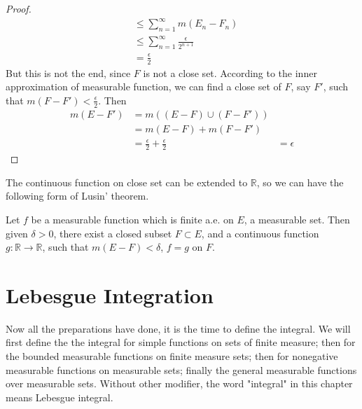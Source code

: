 \documentclass[lang=en, 12pt]{elegantbook}
\newcommand{\RR}{\mathbb{R}}
\begin{document}
\begin{proof}
\begin{equation*}
\begin{aligned}
                    &\leq \sum_{n=1}^{\infty}m(E_n - F_n)\\
                    &\leq \sum_{n=1}^{\infty} \frac{\epsilon}{2^{n+1}}\\
                    &= \frac{\epsilon}{2} 
                \end{aligned}
            \end{equation*}
                But this is not the end, since $F$ is not a close set. According to the inner approximation of measurable function, we can
            find a close set of $F$, say $F'$, such that $m(F-F')< \frac{\epsilon}{2}$. Then 
            \begin{equation*}
                \begin{aligned}
                    m(E-F') &= m ((E-F) \cup (F-F'))\\
                    &= m(E-F) + m(F-F')\\
                    &=\frac{\epsilon}{2} +\frac{\epsilon}{2}
                    &=\epsilon 
                \end{aligned}
            \end{equation*}
            \end{proof}
            The continuous function on close set can be extended to $\RR$, so we can have the following form of Lusin' theorem.
            \begin{theorem}
                Let $f$ be a measurable function which is finite a.e. on $E$, a measurable set. Then given $\delta > 0$, 
            there exist a closed subset $F \subset E$, and a continuous function $g: \RR \to \RR$, such that $m(E-F)< \delta$, 
            $f = g$ on $F$.
            \end{theorem}   
    
    \chapter{Lebesgue Integration}
        Now all the preparations have done, it is the time to define the integral. We will first define the the integral for simple functions
    on sets of finite measure; then for the bounded measurable functions on finite measure sets; then for nonegative measurable functions on measurable sets;
    finally the general measurable functions over measurable sets. Without other modifier, the word "integral" in this chapter means Lebesgue
    integral.
\end{document}

